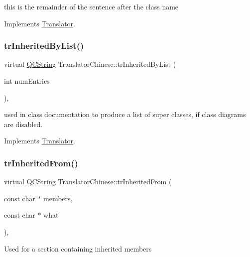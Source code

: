this is the remainder of the sentence after the class name 

Implements \mbox{\hyperlink{class_translator}{Translator}}.

\mbox{\label{class_translator_chinese_ad901658ccf543f52a90800d8ad522550}} 
\subsubsection{\texorpdfstring{trInheritedByList()}{trInheritedByList()}}
{\footnotesize\ttfamily virtual \mbox{\hyperlink{class_q_c_string}{Q\+C\+String}} Translator\+Chinese\+::tr\+Inherited\+By\+List (\begin{DoxyParamCaption}\item[{int}]{num\+Entries }\end{DoxyParamCaption})\hspace{0.3cm}{\ttfamily [inline]}, {\ttfamily [virtual]}}

used in class documentation to produce a list of super classes, if class diagrams are disabled. 

Implements \mbox{\hyperlink{class_translator}{Translator}}.

\mbox{\label{class_translator_chinese_a595215852c20040eca3c8e890f986da1}} 
\subsubsection{\texorpdfstring{trInheritedFrom()}{trInheritedFrom()}}
{\footnotesize\ttfamily virtual \mbox{\hyperlink{class_q_c_string}{Q\+C\+String}} Translator\+Chinese\+::tr\+Inherited\+From (\begin{DoxyParamCaption}\item[{const char $\ast$}]{members,  }\item[{const char $\ast$}]{what }\end{DoxyParamCaption})\hspace{0.3cm}{\ttfamily [inline]}, {\ttfamily [virtual]}}

Used for a section containing inherited members 


